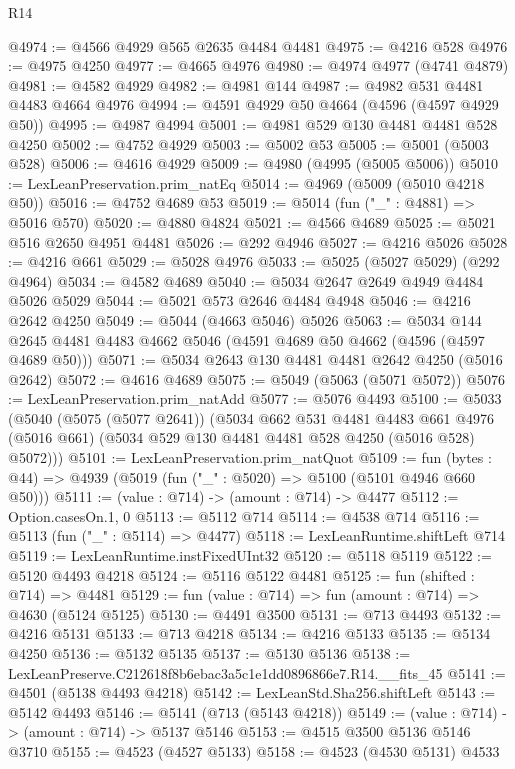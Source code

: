 \begin{lexlean}{R14}
\begin{coremodule}
@4974 := @4566 @4929 @565 @2635 @4484 @4481
@4975 := @4216 @528
@4976 := @4975 @4250
@4977 := @4665 @4976
@4980 := @4974 @4977 (@4741 @4879)
@4981 := @4582 @4929
@4982 := @4981 @144
@4987 := @4982 @531 @4481 @4483 @4664 @4976
@4994 := @4591 @4929 @50 @4664 (@4596 (@4597 @4929 @50))
@4995 := @4987 @4994
@5001 := @4981 @529 @130 @4481 @4481 @528 @4250
@5002 := @4752 @4929
@5003 := @5002 @53
@5005 := @5001 (@5003 @528)
@5006 := @4616 @4929
@5009 := @4980 (@4995 (@5005 @5006))
@5010 := LexLeanPreservation.prim_natEq
@5014 := @4969 (@5009 (@5010 @4218 @50))
@5016 := @4752 @4689 @53
@5019 := @5014 (fun ("_" : @4881) => @5016 @570)
@5020 := @4880 @4824
@5021 := @4566 @4689
@5025 := @5021 @516 @2650 @4951 @4481
@5026 := @292 @4946
@5027 := @4216 @5026
@5028 := @4216 @661
@5029 := @5028 @4976
@5033 := @5025 (@5027 @5029) (@292 @4964)
@5034 := @4582 @4689
@5040 := @5034 @2647 @2649 @4949 @4484 @5026 @5029
@5044 := @5021 @573 @2646 @4484 @4948
@5046 := @4216 @2642 @4250
@5049 := @5044 (@4663 @5046) @5026
@5063 := @5034 @144 @2645 @4481 @4483 @4662 @5046 (@4591 @4689 @50 @4662 (@4596 (@4597 @4689 @50)))
@5071 := @5034 @2643 @130 @4481 @4481 @2642 @4250 (@5016 @2642)
@5072 := @4616 @4689
@5075 := @5049 (@5063 (@5071 @5072))
@5076 := LexLeanPreservation.prim_natAdd
@5077 := @5076 @4493
@5100 := @5033
    (@5040
      (@5075 (@5077 @2641))
      (@5034
        @662
        @531
        @4481
        @4483
        @661
        @4976
        (@5016 @661)
        (@5034 @529 @130 @4481 @4481 @528 @4250 (@5016 @528) @5072)))
@5101 := LexLeanPreservation.prim_natQuot
@5109 := fun (bytes : @44) => @4939 (@5019 (fun ("_" : @5020) => @5100 (@5101 @4946 @660 @50)))
@5111 := (value : @714) -> (amount : @714) -> @4477
@5112 := Option.casesOn.{1, 0}
@5113 := @5112 @714
@5114 := @4538 @714
@5116 := @5113 (fun ("_" : @5114) => @4477)
@5118 := LexLeanRuntime.shiftLeft @714
@5119 := LexLeanRuntime.instFixedUInt32
@5120 := @5118 @5119
@5122 := @5120 @4493 @4218
@5124 := @5116 @5122 @4481
@5125 := fun (shifted : @714) => @4481
@5129 := fun (value : @714) => fun (amount : @714) => @4630 (@5124 @5125)
@5130 := @4491 @3500
@5131 := @713 @4493
@5132 := @4216 @5131
@5133 := @713 @4218
@5134 := @4216 @5133
@5135 := @5134 @4250
@5136 := @5132 @5135
@5137 := @5130 @5136
@5138 := LexLeanPreserve.C212618f8b6ebac3a5c1e1dd0896866e7.R14.__fits_45
@5141 := @4501 (@5138 @4493 @4218)
@5142 := LexLeanStd.Sha256.shiftLeft
@5143 := @5142 @4493
@5146 := @5141 (@713 (@5143 @4218))
@5149 := (value : @714) -> (amount : @714) -> @5137 @5146
@5153 := @4515 @3500 @5136 @5146 @3710
@5155 := @4523 (@4527 @5133)
@5158 := @4523 (@4530 @5131) @4533

\end{coremodule}
\end{lexlean}
